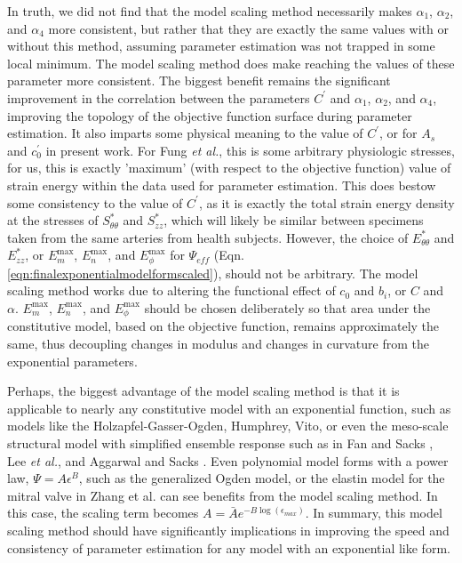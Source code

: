 	In truth, we did not find that the model scaling method necessarily makes $\alpha_1$, $\alpha_2$, and $\alpha_4$ more consistent, but rather that they are exactly the same values with or without this method, assuming parameter estimation was not trapped in some local minimum. The model scaling method does make reaching the values of these parameter more consistent. The biggest benefit remains the significant improvement in the correlation between the parameters $C^\prime$ and $\alpha_1$, $\alpha_2$, and $\alpha_4$, improving the topology of the objective function surface during parameter estimation. It also imparts some physical meaning to the value of $C^\prime$, or for $A_s$ and $c_0^\prime$ in present work. For Fung \textit{et al.}, this is some arbitrary physiologic stresses, for us, this is exactly 'maximum' (with respect to the objective function) value of strain energy within the data used for parameter estimation. This does bestow some consistency to the value of $C^\prime$, as it is exactly the total strain energy density at the stresses of $S_{\theta\theta}^*$ and $S_{zz}^*$, which will likely be similar between specimens taken from the same arteries from health subjects. However, the choice of $E_{\theta\theta}^*$ and $E_{zz}^*$, or $E_m^\mathrm{max}$, $E_n^\mathrm{max}$, and $E_\phi^\mathrm{max}$ for $\Psi_{eff}$ (Eqn. \ref{eqn:finalexponentialmodelformscaled}), should not be arbitrary. The model scaling method works due to altering the functional effect of $c_0$ and $b_i$, or $C$ and $\alpha$. $E_m^\mathrm{max}$, $E_n^\mathrm{max}$, and $E_\phi^\mathrm{max}$ should be chosen deliberately so that area under the constitutive model, based on the objective function, remains approximately the same, thus decoupling changes in modulus and changes in curvature from the exponential parameters. 


	Perhaps, the biggest advantage of the model scaling method is that it is applicable to nearly any constitutive model with an exponential function, such as models like the Holzapfel-Gasser-Ogden, Humphrey, Vito, or even the meso-scale structural model with simplified ensemble response such as in Fan and Sacks \cite{fan_simulation_2014a}, Lee \textit{et al.}\cite{lee_effects_2015}, and Aggarwal and Sacks \cite{aggarwal_inverse_2015}. Even polynomial model forms with a power law, $\Psi=A\epsilon^B$, such as the generalized Ogden model, or the elastin model for the mitral valve in Zhang et al. \cite{zhang_meso_2016} can see benefits from the model scaling method. In this case, the scaling term becomes $A = \bar{A} e^{-B \log(\epsilon_{max})}$. In summary, this model scaling method should have significantly implications in improving the speed and consistency of parameter estimation for any model with an exponential like form.
    
